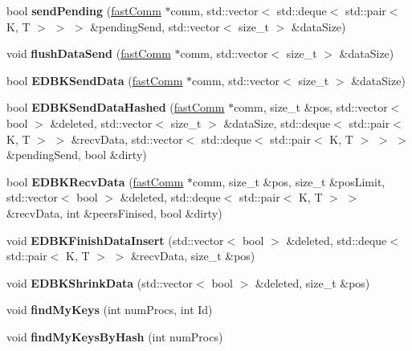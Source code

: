 \begin{DoxyCompactItemize}
\hypertarget{classfaster_1_1workerIFddCore_a843945cd42b91115ef09839a58b6fae3}{}\label{classfaster_1_1workerIFddCore_a843945cd42b91115ef09839a58b6fae3} 
bool {\bfseries send\+Pending} (\hyperlink{classfaster_1_1fastComm}{fast\+Comm} $\ast$comm, std\+::vector$<$ std\+::deque$<$ std\+::pair$<$ K, T $>$ $>$ $>$ \&pending\+Send, std\+::vector$<$ size\+\_\+t $>$ \&data\+Size)
\item 
\hypertarget{classfaster_1_1workerIFddCore_ae7334c73b43b3b69add5a219307160c0}{}\label{classfaster_1_1workerIFddCore_ae7334c73b43b3b69add5a219307160c0} 
void {\bfseries flush\+Data\+Send} (\hyperlink{classfaster_1_1fastComm}{fast\+Comm} $\ast$comm, std\+::vector$<$ size\+\_\+t $>$ \&data\+Size)
\item 
\hypertarget{classfaster_1_1workerIFddCore_a19cb3d9e3d4cb89f192ef3f93fe15c87}{}\label{classfaster_1_1workerIFddCore_a19cb3d9e3d4cb89f192ef3f93fe15c87} 
bool {\bfseries E\+D\+B\+K\+Send\+Data} (\hyperlink{classfaster_1_1fastComm}{fast\+Comm} $\ast$comm, std\+::vector$<$ size\+\_\+t $>$ \&data\+Size)
\item 
\hypertarget{classfaster_1_1workerIFddCore_a5b238ef5c3ac36354e4104d833462cc5}{}\label{classfaster_1_1workerIFddCore_a5b238ef5c3ac36354e4104d833462cc5} 
bool {\bfseries E\+D\+B\+K\+Send\+Data\+Hashed} (\hyperlink{classfaster_1_1fastComm}{fast\+Comm} $\ast$comm, size\+\_\+t \&pos, std\+::vector$<$ bool $>$ \&deleted, std\+::vector$<$ size\+\_\+t $>$ \&data\+Size, std\+::deque$<$ std\+::pair$<$ K, T $>$ $>$ \&recv\+Data, std\+::vector$<$ std\+::deque$<$ std\+::pair$<$ K, T $>$ $>$ $>$ \&pending\+Send, bool \&dirty)
\item 
\hypertarget{classfaster_1_1workerIFddCore_a966de2775dec3ef08888bbc3c9fa2df3}{}\label{classfaster_1_1workerIFddCore_a966de2775dec3ef08888bbc3c9fa2df3} 
bool {\bfseries E\+D\+B\+K\+Recv\+Data} (\hyperlink{classfaster_1_1fastComm}{fast\+Comm} $\ast$comm, size\+\_\+t \&pos, size\+\_\+t \&pos\+Limit, std\+::vector$<$ bool $>$ \&deleted, std\+::deque$<$ std\+::pair$<$ K, T $>$ $>$ \&recv\+Data, int \&peers\+Finised, bool \&dirty)
\item 
\hypertarget{classfaster_1_1workerIFddCore_a89c2b2919d214080308c51b782970e98}{}\label{classfaster_1_1workerIFddCore_a89c2b2919d214080308c51b782970e98} 
void {\bfseries E\+D\+B\+K\+Finish\+Data\+Insert} (std\+::vector$<$ bool $>$ \&deleted, std\+::deque$<$ std\+::pair$<$ K, T $>$ $>$ \&recv\+Data, size\+\_\+t \&pos)
\item 
\hypertarget{classfaster_1_1workerIFddCore_ab85a44c3120f6ddb9373a54433e651fb}{}\label{classfaster_1_1workerIFddCore_ab85a44c3120f6ddb9373a54433e651fb} 
void {\bfseries E\+D\+B\+K\+Shrink\+Data} (std\+::vector$<$ bool $>$ \&deleted, size\+\_\+t \&pos)
\item 
\hypertarget{classfaster_1_1workerIFddCore_ab6af3f576a6e12522d5431a912ad31b1}{}\label{classfaster_1_1workerIFddCore_ab6af3f576a6e12522d5431a912ad31b1} 
void {\bfseries find\+My\+Keys} (int num\+Procs, int Id)
\item 
\hypertarget{classfaster_1_1workerIFddCore_ae630f5485449b19d02a24a3de6c27bde}{}\label{classfaster_1_1workerIFddCore_ae630f5485449b19d02a24a3de6c27bde} 
void {\bfseries find\+My\+Keys\+By\+Hash} (int num\+Procs)
\end{DoxyCompactItemize}

